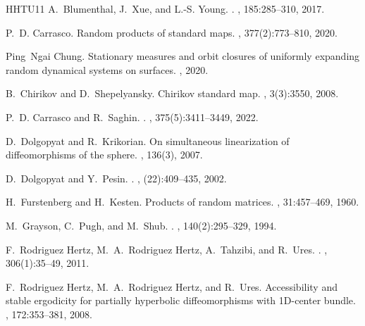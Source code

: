 \documentclass[11pt,letterpaper,reqno]{article}
\begin{document}
\begin{thebibliography}{HHTU11}
A.~Blumenthal, J.~Xue, and L.-S. Young.
.
, 185:285--310, 2017.

P.~D. Carrasco.
\newblock Random products of standard maps.
, 377(2):773--810, 2020.

Ping~Ngai Chung.
\newblock Stationary measures and orbit closures of uniformly expanding random
  dynamical systems on surfaces.
, 2020.

B.~Chirikov and D.~Shepelyansky.
\newblock Chirikov standard map.
, 3(3):3550, 2008.

P.~D. Carrasco and R.~Saghin.
.
, 375(5):3411--3449, 2022.

D.~Dolgopyat and R.~Krikorian.
\newblock On simultaneous linearization of diffeomorphisms of the sphere.
, 136(3), 2007.

D.~Dolgopyat and Y.~Pesin.
.
, (22):409--435, 2002.

H.~Furstenberg and H.~Kesten.
\newblock Products of random matrices.
, 31:457--469, 1960.

M.~Grayson, C.~Pugh, and M.~Shub.
.
, 140(2):295--329, 1994.

F.~Rodriguez Hertz, M.~A.~Rodriguez Hertz, A.~Tahzibi, and R.~Ures.
.
, 306(1):35--49, 2011.

F.~Rodriguez Hertz, M.~A.~Rodriguez Hertz, and R.~Ures.
\newblock Accessibility and stable ergodicity for partially hyperbolic
  diffeomorphisms with 1{D}-center bundle.
, 172:353--381, 2008.


\end{thebibliography}
\end{document}
